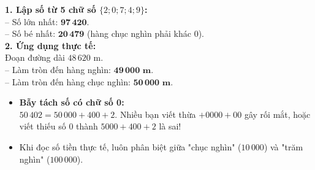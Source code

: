 \documentclass[11pt,a4paper]{article}
\begin{document}
\vspace{-2.5mm}
\noindent
\begin{minipage}[t]{0.49\textwidth}\vspace{0pt}
\begin{tcolorbox}[
  enhanced,
  colback=green!4!white,
  colframe=green!60!black,
  arc=2mm, boxrule=0.8pt,
  left=2mm, right=2mm, top=1.8mm, bottom=1.8mm,
  title={\footnotesize\bfseries\color{white}\faCheckCircle\ Ví dụ thực hành chuẩn mực}
]
{\footnotesize
\textbf{1. Lập số từ 5 chữ số $\{2; 0; 7; 4; 9\}$:}\\
-- Số lớn nhất: $\mathbf{97\,420}$.\\
-- Số bé nhất: $\mathbf{20\,479}$ (hàng chục nghìn phải khác $0$).\\
\textbf{2. Ứng dụng thực tế:}\\
Đoạn đường dài $48\,620\text{ m}$.\\
-- Làm tròn đến hàng nghìn: $\mathbf{49\,000\text{ m}}$.\\
-- Làm tròn đến hàng chục nghìn: $\mathbf{50\,000\text{ m}}$.
}
\end{tcolorbox}
\end{minipage}
\hfill
\begin{minipage}[t]{0.49\textwidth}\vspace{0pt}
\begin{tcolorbox}[
  enhanced,
  colback=red!4!white,
  colframe=red!70!black,
  arc=2mm, boxrule=0.8pt,
  left=2mm, right=2mm, top=1.8mm, bottom=1.8mm,
  title={\footnotesize\bfseries\color{white}\faExclamationTriangle\ Mẹo tránh bẫy trắc nghiệm}
]
{\footnotesize
\begin{itemize}\setlength{\itemsep}{1.5pt}\setlength{\leftskip}{-2.5mm}
  \item \textbf{Bẫy tách số có chữ số 0:}\\
  $50\,402 = 50\,000 + 400 + 2$. Nhiều bạn viết thừa $+ 0000 + 00$ gây rối mắt, hoặc viết thiếu số $0$ thành $5000 + 400 + 2$ là sai!
  \item Khi đọc số tiền thực tế, luôn phân biệt giữa "chục nghìn" ($10\,000$) và "trăm nghìn" ($100\,000$).
\end{itemize}
}
\end{tcolorbox}
\end{minipage}
\end{document}
